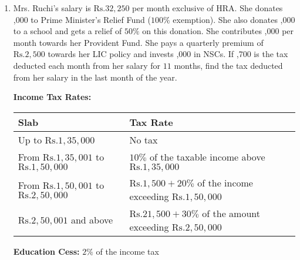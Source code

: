 \documentclass{article}
\begin{document}
\begin{enumerate}
\item Mrs. Ruchi's salary is $\text{Rs.} 32,250$ per month exclusive of HRA. She donates ,000 to Prime Minister's Relief Fund ($100\%$ exemption). She also donates ,000 to a school and gets a relief of $50\%$ on this donation. She contributes ,000 per month towards her Provident Fund. She pays a quarterly premium of $\text{Rs.} 2,500$ towards her LIC policy and invests ,000 in NSCs. If ,700 is the tax deducted each month from her salary for $11$ months, find the tax deducted from her salary in the last month of the year.

\textbf{Income Tax Rates:}

\begin{tabular}{|l|l|}
\hline
Slab & Tax Rate \\
\hline
Up to $\text{Rs.} 1,35,000$ & No tax \\
\hline
From $\text{Rs.} 1,35,001$ to $\text{Rs.} 1,50,000$ & $10\%$ of the taxable income above $\text{Rs.} 1,35,000$ \\
\hline
From $\text{Rs.} 1,50,001$ to $\text{Rs.} 2,50,000$ & $\text{Rs.} 1,500 + 20\%$ of the income exceeding $\text{Rs.} 1,50,000$ \\
\hline
$\text{Rs.} 2,50,001$ and above & $\text{Rs.} 21,500 + 30\%$ of the amount exceeding $\text{Rs.} 2,50,000$ \\
\hline
\end{tabular}

\textbf{Education Cess:} $2\%$ of the income tax


\end{enumerate}
\end{document}
